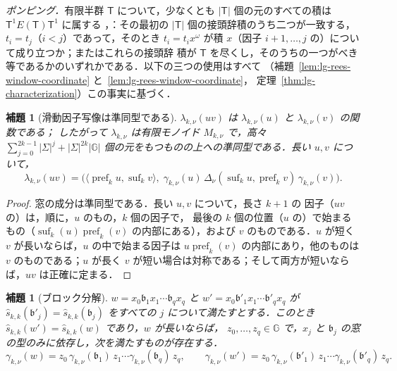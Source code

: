 \documentclass[11pt,a4paper]{ltjsarticle}
\numberwithin{equation}{section}
\theoremstyle{plain}
\newtheorem{lemma}[theorem]{補題}
\theoremstyle{definition}
\theoremstyle{remark}
\theoremstyle{plain}
\begin{document}
\emph{ポンピング．}有限半群 $\mathsf T$ について，少なくとも
$|\mathsf T|$ 個の元のすべての積は $\mathsf T^1E(\mathsf T)\mathsf T^1$ に属する
\cite[Lemma~2.2]{AlmeidaEtAl2009}，\cite{Pin1986}：その最初の
$|\mathsf T|$ 個の接頭辞積のうち二つが一致する，$t_i=t_j$（$i<j$）であって，そのとき
$t_i=t_ix^\omega$ が積 $x$（因子 $i+1,\ldots,j$ の）について成り立つか；またはこれらの接頭辞
積が $\mathsf T$ を尽くし，そのうちの一つがべき等であるかのいずれかである．以下の三つの使用はすべて
（補題~\ref{lem:lg-rees-window-coordinate} と~\ref{lem:lg-rees-window-coordinate}，
定理~\ref{thm:lg-characterization}）この事実に基づく．

\begin{lemma}[滑動因子写像は準同型である]
\label{lem:local-group-morphism}
$\lambda_{k,\nu}(uv)$ は $\lambda_{k,\nu}(u)$ と $\lambda_{k,\nu}(v)$ の関数である；
したがって $\lambda_{k,\nu}$ は有限モノイド $M_{k,\nu}$ で，高々
$\sum_{j=0}^{2k-1}|\Sigma|^j+|\Sigma|^{2k}|{\mathbb G}|$ 個の元をもつものの上への準同型である．長い $u,v$ について，
\[
 \lambda_{k,\nu}(uv)
 =\bigl(\langle\operatorname{pref}_ku,\operatorname{suf}_kv\rangle,\;
   \gamma_{k,\nu}(u)\,\Delta_\nu(\operatorname{suf}_ku,\operatorname{pref}_kv)\,
   \gamma_{k,\nu}(v)\bigr).
\]
\end{lemma}

\begin{proof}
窓の成分は準同型である．長い $u,v$ について，長さ $k+1$ の
因子（$uv$ の）は，順に，$u$ のもの，$k$ 個の因子で，
最後の $k$ 個の位置（$u$ の）で始まるもの（$\operatorname{suf}_k(u)\operatorname{pref}_k(v)$ の内部にある），および
$v$ のものである．$u$ が短く $v$ が長いならば，$u$ の中で始まる因子は
$u\operatorname{pref}_k(v)$ の内部にあり，他のものは $v$ のものである；$u$ が長く
$v$ が短い場合は対称である；そして両方が短いならば，$uv$ は正確に定まる．
\end{proof}

\begin{lemma}[ブロック分解]
\label{lem:local-group-blocks}
$w=x_0\mathfrak b_1x_1\cdots\mathfrak b_qx_q$ と $w'=x_0\mathfrak b'_1x_1\cdots\mathfrak b'_qx_q$ が
$\widehat s_{k,k}(\mathfrak b'_j)=\widehat s_{k,k}(\mathfrak b_j)$ をすべての $j$ について満たすとする．このとき
$\widehat s_{k,k}(w')=\widehat s_{k,k}(w)$ であり，$w$ が長いならば，
$z_0,\ldots,z_q\in {\mathbb G}$ で，$x_j$ と
$\mathfrak b_j$ の窓の型のみに依存し，次を満たすものが存在する．
\[
 \gamma_{k,\nu}(w)=z_0\,\gamma_{k,\nu}(\mathfrak b_1)\,z_1\cdots\gamma_{k,\nu}(\mathfrak b_q)\,z_q,
 \qquad
 \gamma_{k,\nu}(w')=z_0\,\gamma_{k,\nu}(\mathfrak b'_1)\,z_1\cdots\gamma_{k,\nu}(\mathfrak b'_q)\,z_q .
\]
\end{lemma}
\end{document}
